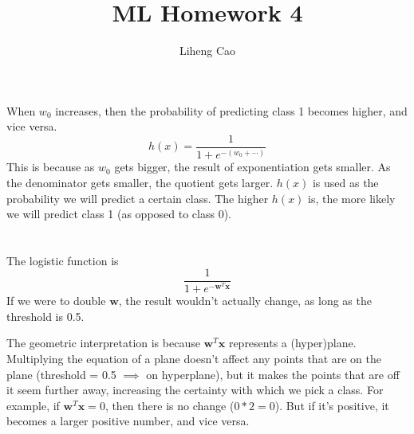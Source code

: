 \documentclass[12pt]{article}
\title{ML Homework 4}
\author{Liheng Cao}
\begin{document}
\maketitle

\section{}
When $ w_0 $ increases, then the probability of predicting class 1 becomes higher, and vice versa. 
\[ h(x) = \dfrac{1}{1+e^{-(w_0 + \cdots)}} \]
This is because as $ w_0 $ gets bigger, the result of exponentiation gets smaller. As the denominator gets smaller, the quotient gets larger. $ h(x) $ is used as the probability we will predict a certain class. The higher $ h(x) $ is, the more likely we will predict class 1 (as opposed to class 0).
\newpage

\section{}
The logistic function is \[ \dfrac{1}{1+e^{-\textbf{w}^T \textbf{x}}} \]
If we were to double $ \textbf{w} $, the result wouldn't actually change, as long as the threshold is 0.5. 

The geometric interpretation is because $ \textbf{w}^T\textbf{x} $ represents a (hyper)plane. Multiplying the equation of a plane doesn't affect any points that are on the plane (threshold = 0.5 $\implies$ on hyperplane), but it makes the points that are off it seem further away, increasing the certainty with which we pick a class. For example, if $ \textbf{w}^T\textbf{x} = 0$, then there is no change ($ 0 * 2 = 0 $). But if it's positive, it becomes a larger positive number, and vice versa.
\newpage
\end{document}
